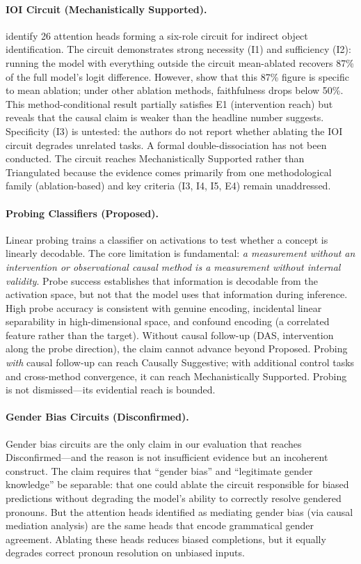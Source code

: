 \documentclass{article}
\begin{document}
\paragraph{IOI Circuit (Mechanistically Supported).} \citet{wang2023interpretability} identify 26 attention heads forming a six-role circuit for indirect object identification. The circuit demonstrates strong necessity (I1) and sufficiency (I2): running the model with everything outside the circuit mean-ablated recovers 87\% of the full model's logit difference. However, \citet{miller2024transformer} show that this 87\% figure is specific to mean ablation; under other ablation methods, faithfulness drops below 50\%. This method-conditional result partially satisfies E1 (intervention reach) but reveals that the causal claim is weaker than the headline number suggests. Specificity (I3) is untested: the authors do not report whether ablating the IOI circuit degrades unrelated tasks. A formal double-dissociation has not been conducted. The circuit reaches Mechanistically Supported rather than Triangulated because the evidence comes primarily from one methodological family (ablation-based) and key criteria (I3, I4, I5, E4) remain unaddressed.

\paragraph{Probing Classifiers (Proposed).} Linear probing \citep{belinkov2022probing} trains a classifier on activations to test whether a concept is linearly decodable. The core limitation is fundamental: \emph{a measurement without an intervention or observational causal method is a measurement without internal validity}. Probe success establishes that information is decodable from the activation space, but not that the model uses that information during inference. High probe accuracy is consistent with genuine encoding, incidental linear separability in high-dimensional space, and confound encoding (a correlated feature rather than the target). Without causal follow-up (DAS, intervention along the probe direction), the claim cannot advance beyond Proposed. Probing \emph{with} causal follow-up can reach Causally Suggestive; with additional control tasks and cross-method convergence, it can reach Mechanistically Supported. Probing is not dismissed---its evidential reach is bounded.

\paragraph{Gender Bias Circuits (Disconfirmed).} Gender bias circuits \citep{vig2020gender} are the only claim in our evaluation that reaches Disconfirmed---and the reason is not insufficient evidence but an incoherent construct. The claim requires that ``gender bias'' and ``legitimate gender knowledge'' be separable: that one could ablate the circuit responsible for biased predictions without degrading the model's ability to correctly resolve gendered pronouns. But the attention heads identified as mediating gender bias (via causal mediation analysis) are the same heads that encode grammatical gender agreement. Ablating these heads reduces biased completions, but it equally degrades correct pronoun resolution on unbiased inputs.
\end{document}
